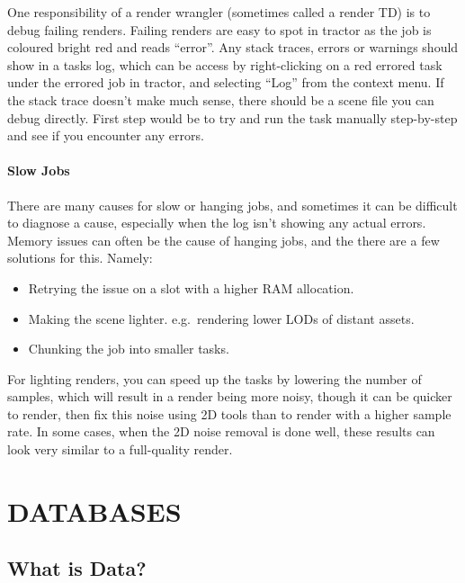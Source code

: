 One responsibility of a render wrangler (sometimes called a render TD) is to debug failing renders. Failing renders are easy to spot in tractor as the job is coloured bright red and reads ``error''. Any stack traces, errors or warnings should show in a tasks log, which can be access by right-clicking on a red errored task under the errored job in tractor, and selecting ``Log'' from the context menu. If the stack trace doesn't make much sense, there should be a scene file you can debug directly. First step would be to try and run the task manually step-by-step and see if you encounter any errors.

\hypertarget{slow-jobs}{%
\paragraph{Slow Jobs}\label{slow-jobs}}

There are many causes for slow or hanging jobs, and sometimes it can be difficult to diagnose a cause, especially when the log isn't showing any actual errors. Memory issues can often be the cause of hanging jobs, and the there are a few solutions for this. Namely:

\begin{itemize}
\tightlist
\item
  Retrying the issue on a slot with a higher RAM allocation.
\item
  Making the scene lighter. e.g.~rendering lower LODs of distant assets.
\item
  Chunking the job into smaller tasks.
\end{itemize}

For lighting renders, you can speed up the tasks by lowering the number of samples, which will result in a render being more noisy, though it can be quicker to render, then fix this noise using 2D tools than to render with a higher sample rate. In some cases, when the 2D noise removal is done well, these results can look very similar to a full-quality render.

\pagebreak\hypertarget{databases}{%
\section{DATABASES}\label{databases}}

\hypertarget{what-is-data}{%
\subsection{What is Data?}\label{what-is-data}}

